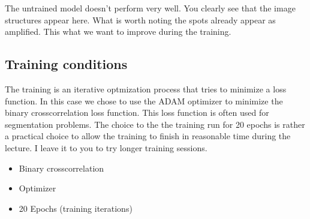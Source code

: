 \documentclass[letterpaper,10pt,english]{sphinxmanual}
\begin{document}
\begin{sphinxVerbatim}[commandchars=\\\{\}]
  
\end{sphinxVerbatim}

\noindent{}

The untrained model doesn’t perform very well. You clearly see that the image structures appear here. What is worth noting the spots already appear as amplified. This what we want to improve during the training.


\subsection{Training conditions}
\label{\detokenize{ML4NeutronImageSegmentation:training-conditions}}
The training is an iterative optmization process that tries to minimize a loss function. In this case we chose to use the ADAM optimizer to minimize the binary cross\sphinxhyphen{}correlation loss function. This loss function is often used for segmentation problems. The choice to the the training run for 20 epochs is rather a practical choice to allow the training to finish in reasonable time during the lecture. I leave it to you to try longer training sessions.
\begin{itemize}
\item {} 
 \sphinxhyphen{} Binary cross\sphinxhyphen{}correlation

\item {} 
Optimizer \sphinxhyphen{} 

\item {} 
20 Epochs (training iterations)

\end{itemize}
\end{document}
